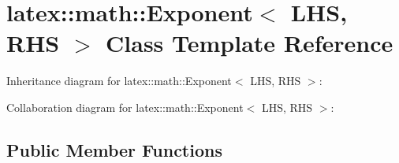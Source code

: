 \hypertarget{classlatex_1_1math_1_1Exponent}{\section{latex\-:\-:math\-:\-:\-Exponent$<$ \-L\-H\-S, \-R\-H\-S $>$ \-Class \-Template \-Reference}
\label{classlatex_1_1math_1_1Exponent}
}


\-Inheritance diagram for latex\-:\-:math\-:\-:\-Exponent$<$ \-L\-H\-S, \-R\-H\-S $>$\-:


\-Collaboration diagram for latex\-:\-:math\-:\-:\-Exponent$<$ \-L\-H\-S, \-R\-H\-S $>$\-:
\subsection*{\-Public \-Member \-Functions}
